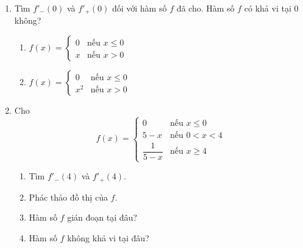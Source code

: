 \fontsize{9}{12}\selectfont

\noindent
\begin{minipage}[t]{0.485\textwidth}
\begin{enumerate}[label=\textbf{\arabic*.}, leftmargin=1.5em, start=64, itemsep=6pt, topsep=0pt]
    \item Tìm $f'_-(0)$ và $f'_+(0)$ đối với hàm số $f$ đã cho. Hàm số $f$ có khả vi tại $0$ không?
    \begin{enumerate}[label=(\alph*), leftmargin=1.6em, itemsep=2pt, topsep=2pt]
        \item $f(x) = \begin{cases} 
            0 & \text{nếu } x \leqslant 0 \\ 
            x & \text{nếu } x > 0 
        \end{cases}$
        \item $f(x) = \begin{cases} 
            0 & \text{nếu } x \leqslant 0 \\ 
            x^2 & \text{nếu } x > 0 
        \end{cases}$
    \end{enumerate}

    \item Cho
    \[
    f(x) = \begin{cases} 
        0 & \text{nếu } x \leqslant 0 \\ 
        5 - x & \text{nếu } 0 < x < 4 \\ 
        \dfrac{1}{5-x} & \text{nếu } x \geqslant 4 
    \end{cases}
    \]
    \begin{enumerate}[label=(\alph*), leftmargin=1.6em, itemsep=1.5pt, topsep=2pt]
        \item Tìm $f'_-(4)$ và $f'_+(4)$.
        \item Phác thảo đồ thị của $f$.
        \item Hàm số $f$ gián đoạn tại đâu?
        \item Hàm số $f$ không khả vi tại đâu?
    \end{enumerate}
\end{enumerate}

\vspace{6pt}
\noindent{\color{stewartcyan}\rule{\linewidth}{0.8pt}}
\end{minipage}%
